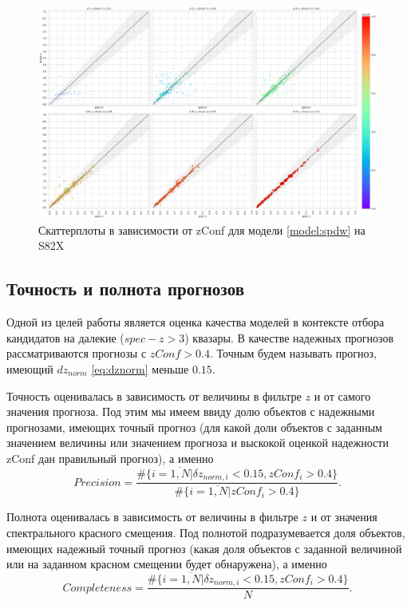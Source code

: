 \documentclass[fleqn,usenatbib]{mnras}
\begin{document}
\begin{figure}
    \centering
    \includegraphics[width=0.99\linewidth]{images/zconf-scatterplot-35-s82x.png}
    \caption{Скаттерплоты в зависимости от zConf для модели \ref{model:spdw} на S82X}
    \label{fig:zconf-scatterplot-35}
\end{figure}

\subsection{Точность и полнота прогнозов}\label{ssec:precision-and-completeness}

Одной из целей работы является оценка качества моделей в контексте отбора кандидатов на далекие ($spec-z > 3$) квазары. В качестве надежных прогнозов рассматриваются прогнозы с $zConf > 0.4$. Точным будем называть прогноз, имеющий $dz_{norm}$ \eqref{eq:dznorm} меньше $0.15$.

Точность оценивалась в зависимость от величины в фильтре $z$ и от самого значения прогноза. Под этим мы имеем ввиду долю объектов с надежными прогнозами, имеющих точный прогноз (для какой доли объектов с заданным значением величины или значением прогноза и выскокой оценкой надежности zConf дан правильный прогноз), а именно \begin{equation}\label{eq:precision}
    Precision = \frac{\#\{i = \overline{1, N} | \delta z_{norm, i} < 0.15, zConf_i > 0.4\}}{\#\{i = \overline{1, N} | zConf_i > 0.4\}}.
\end{equation}

Полнота оценивалась в зависимость от величины в фильтре $z$ и от значения спектрального красного смещения. Под полнотой подразумевается доля объектов, имеющих надежный точный прогноз (какая доля объектов с заданной величиной или на заданном красном смещении будет обнаружена), а именно \begin{equation}\label{eq:completeness}
    Completeness = \frac{\#\{i = \overline{1, N} | \delta z_{norm, i} < 0.15, zConf_i > 0.4\}}{N}.
\end{equation}
\end{document}
